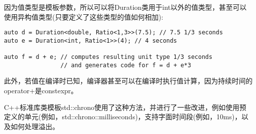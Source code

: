 因为值类型是模板参数，所以可以将Duration类用于int以外的值类型，甚至可以使用异构值类型(只要定义了这些类型的值如何相加):

\begin{lstlisting}[style=styleCXX]
auto d = Duration<double, Ratio<1,3>>(7.5); // 7.5 1/3 seconds
auto e = Duration<int, Ratio<1>>(4); // 4 seconds

auto f = d + e; // computes resulting unit type 1/3 seconds
				// and generates code for f = d + e*3
\end{lstlisting}

此外，若值在编译时已知，编译器甚至可以在编译时执行值计算，因为持续时间的operator+是constexpr。

C++标准库类模板std::chrono使用了这种方法，并进行了一些改进，例如使用预定义的单元(例如，std::chrono::milliseconds)，支持字面时间段(例如，10ms)，以及如何处理溢出。































